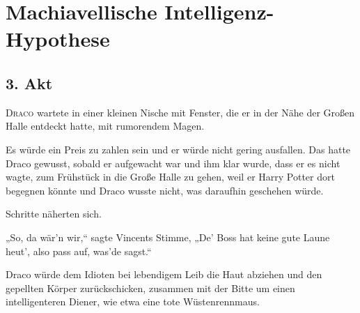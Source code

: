 \chapter{Machiavellische Intelligenz-Hypothese}


\section{3. Akt}

\lettrine{D}{raco} wartete in einer kleinen Nische mit Fenster, die er in der Nähe der Großen Halle entdeckt hatte, mit rumorendem Magen.

Es würde ein Preis zu zahlen sein und er würde nicht gering ausfallen. Das hatte Draco gewusst, sobald er aufgewacht war und ihm klar wurde, dass er es nicht wagte, zum Frühstück in die Große Halle zu gehen, weil er Harry Potter dort begegnen könnte und Draco wusste nicht, was daraufhin geschehen würde.

Schritte näherten sich.

„So, da wär'n wir,“ sagte Vincents Stimme, „De' Boss hat keine gute Laune heut', also pass auf, was'de sagst.“

Draco würde dem Idioten bei lebendigem Leib die Haut abziehen und den gepellten Körper zurückschicken, zusammen mit der Bitte um einen intelligenteren Diener, wie etwa eine tote Wüstenrennmaus.

